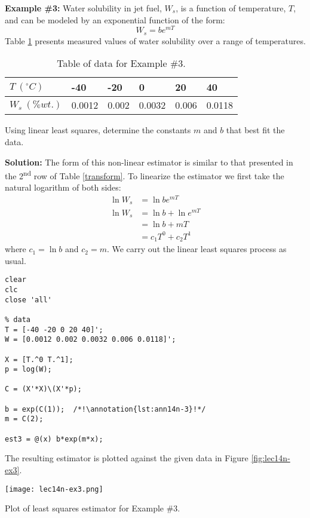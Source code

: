 \vspace{0.5cm}

\noindent \textbf{Example \#3:} Water solubility in jet fuel, $W_s$, is a function of temperature, $T$, and can be modeled by an exponential function of the form:
\begin{equation*}
W_s = be^{mT}
\end{equation*}
Table \ref{tab:lec14n-ex3} presents measured values of water solubility over a range of temperatures.  
\begin{table}
\begin{tabular}{|l|l|l|l|l|l|}
\hline
$T \ (^{\circ}C)$ & -40 & -20 & 0 & 20 & 40\\ \hline
$W_s \ (\% wt. )$ & 0.0012 & 0.002 & 0.0032 & 0.006 & 0.0118 \\ \hline 
\end{tabular}
\caption{Table of data for Example \#3.}
\label{tab:lec14n-ex3}
\end{table}

\vspace{0.1cm}

\noindent Using linear least squares, determine the constants $m$ and $b$ that best fit the data.

\vspace{0.2cm}


\noindent \textbf{Solution: }The form of this non-linear estimator is similar to that presented in the 2\textsuperscript{nd} row of Table \ref{transform}.  To linearize the estimator we first take the natural logarithm of both sides:
\begin{align*}
\ln{W_s} &= \ln{be^{mT}} \\
\ln{W_s} &= \ln{b} + \ln{e^{mT}} \\
&= \ln{b} +  mT \\
&= c_1 T^{0} + c_2T^{1}
\end{align*}
where $c_1 = \ln{b}$ and $c_2 = m$.  We carry out the linear least squares process as usual.

\begin{lstlisting}[style=myMatlab]
clear
clc
close 'all'

% data
T = [-40 -20 0 20 40]';
W = [0.0012 0.002 0.0032 0.006 0.0118]';

X = [T.^0 T.^1];
p = log(W);

C = (X'*X)\(X'*p);

b = exp(C(1));  /*!\annotation{lst:ann14n-3}!*/
m = C(2);

est3 = @(x) b*exp(m*x);
\end{lstlisting}

\vspace{0.1cm}

\noindent The resulting estimator is plotted against the given data in Figure \ref{fig:lec14n-ex3}.

\begin{marginfigure}
\texttt{[image: lec14n-ex3.png]}
\caption{Plot of least squares estimator for Example \#3.}
\label{fig:lec14n-ex3}
\end{marginfigure}




